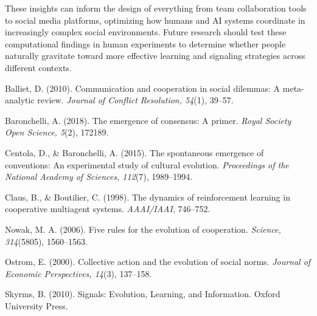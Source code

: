\documentclass[12pt,a4paper]{article}
\begin{document}
These insights can inform the design of everything from team collaboration tools to social media platforms, optimizing how humans and AI systems coordinate in increasingly complex social environments. Future research should test these computational findings in human experiments to determine whether people naturally gravitate toward more effective learning and signaling strategies across different contexts.


\begin{thebibliography}{10}

Balliet, D. (2010).
\newblock Communication and cooperation in social dilemmas: A meta-analytic review.
\newblock \emph{Journal of Conflict Resolution, 54}(1), 39--57.

Baronchelli, A. (2018).
\newblock The emergence of consensus: A primer.
\newblock \emph{Royal Society Open Science, 5}(2), 172189.

Centola, D., \& Baronchelli, A. (2015).
\newblock The spontaneous emergence of conventions: An experimental study of cultural evolution.
\newblock \emph{Proceedings of the National Academy of Sciences, 112}(7), 1989--1994.

Claus, B., \& Boutilier, C. (1998).
\newblock The dynamics of reinforcement learning in cooperative multiagent systems.
\newblock \emph{AAAI/IAAI}, 746--752.

Nowak, M. A. (2006).
\newblock Five rules for the evolution of cooperation.
\newblock \emph{Science, 314}(5805), 1560--1563.

Ostrom, E. (2000).
\newblock Collective action and the evolution of social norms.
\newblock \emph{Journal of Economic Perspectives, 14}(3), 137--158.

Skyrms, B. (2010).
\newblock Signals: Evolution, Learning, and Information.
\newblock Oxford University Press.

\end{thebibliography}
\end{document}
